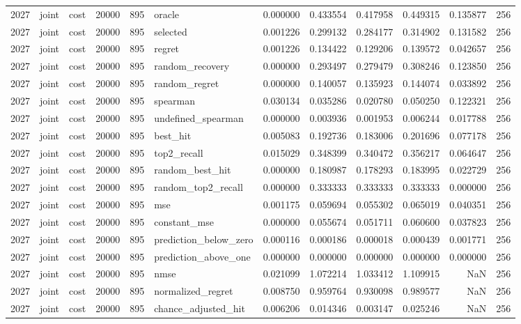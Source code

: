 \begin{tabular}{rllrrlrrrrrr}
2027 & joint & cost & 20000 & 895 & oracle & 0.000000 & 0.433554 & 0.417958 & 0.449315 & 0.135877 & 256 \\
2027 & joint & cost & 20000 & 895 & selected & 0.001226 & 0.299132 & 0.284177 & 0.314902 & 0.131582 & 256 \\
2027 & joint & cost & 20000 & 895 & regret & 0.001226 & 0.134422 & 0.129206 & 0.139572 & 0.042657 & 256 \\
2027 & joint & cost & 20000 & 895 & random_recovery & 0.000000 & 0.293497 & 0.279479 & 0.308246 & 0.123850 & 256 \\
2027 & joint & cost & 20000 & 895 & random_regret & 0.000000 & 0.140057 & 0.135923 & 0.144074 & 0.033892 & 256 \\
2027 & joint & cost & 20000 & 895 & spearman & 0.030134 & 0.035286 & 0.020780 & 0.050250 & 0.122321 & 256 \\
2027 & joint & cost & 20000 & 895 & undefined_spearman & 0.000000 & 0.003936 & 0.001953 & 0.006244 & 0.017788 & 256 \\
2027 & joint & cost & 20000 & 895 & best_hit & 0.005083 & 0.192736 & 0.183006 & 0.201696 & 0.077178 & 256 \\
2027 & joint & cost & 20000 & 895 & top2_recall & 0.015029 & 0.348399 & 0.340472 & 0.356217 & 0.064647 & 256 \\
2027 & joint & cost & 20000 & 895 & random_best_hit & 0.000000 & 0.180987 & 0.178293 & 0.183995 & 0.022729 & 256 \\
2027 & joint & cost & 20000 & 895 & random_top2_recall & 0.000000 & 0.333333 & 0.333333 & 0.333333 & 0.000000 & 256 \\
2027 & joint & cost & 20000 & 895 & mse & 0.001175 & 0.059694 & 0.055302 & 0.065019 & 0.040351 & 256 \\
2027 & joint & cost & 20000 & 895 & constant_mse & 0.000000 & 0.055674 & 0.051711 & 0.060600 & 0.037823 & 256 \\
2027 & joint & cost & 20000 & 895 & prediction_below_zero & 0.000116 & 0.000186 & 0.000018 & 0.000439 & 0.001771 & 256 \\
2027 & joint & cost & 20000 & 895 & prediction_above_one & 0.000000 & 0.000000 & 0.000000 & 0.000000 & 0.000000 & 256 \\
2027 & joint & cost & 20000 & 895 & nmse & 0.021099 & 1.072214 & 1.033412 & 1.109915 & NaN & 256 \\
2027 & joint & cost & 20000 & 895 & normalized_regret & 0.008750 & 0.959764 & 0.930098 & 0.989577 & NaN & 256 \\
2027 & joint & cost & 20000 & 895 & chance_adjusted_hit & 0.006206 & 0.014346 & 0.003147 & 0.025246 & NaN & 256 \\

\end{tabular}
